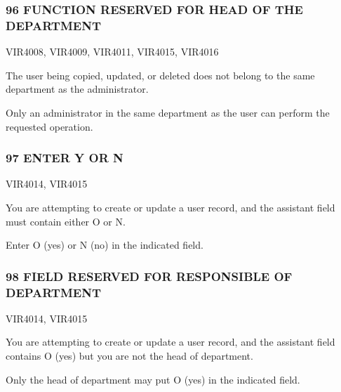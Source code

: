 \documentclass[letterpaper,10pt,english]{sphinxmanual}
\begin{document}
\subsubsection{96 FUNCTION RESERVED FOR HEAD OF THE DEPARTMENT}
\label{\detokenize{messages:function-reserved-for-head-of-the-department}}\begin{description}
\sphinxAtStartPar
VIR4008, VIR4009, VIR4011, VIR4015, VIR4016

\sphinxAtStartPar
The user being copied, updated, or deleted does not belong to the same department as the administrator.

\sphinxAtStartPar
Only an administrator in the same department as the user can perform the requested operation.

\end{description}


\subsubsection{97 ENTER Y OR N}
\label{\detokenize{messages:enter-y-or-n}}\begin{description}
\sphinxAtStartPar
VIR4014, VIR4015

\sphinxAtStartPar
You are attempting to create or update a user record, and the assistant field must contain either O or N.

\sphinxAtStartPar
Enter O (yes) or N (no) in the indicated field.

\end{description}


\subsubsection{98 FIELD RESERVED FOR RESPONSIBLE OF DEPARTMENT}
\label{\detokenize{messages:field-reserved-for-responsible-of-department}}\begin{description}
\sphinxAtStartPar
VIR4014, VIR4015

\sphinxAtStartPar
You are attempting to create or update a user record, and the assistant field contains O (yes) but you are not the head of department.

\sphinxAtStartPar
Only the head of department may put O (yes) in the indicated field.

\end{description}
\end{document}
